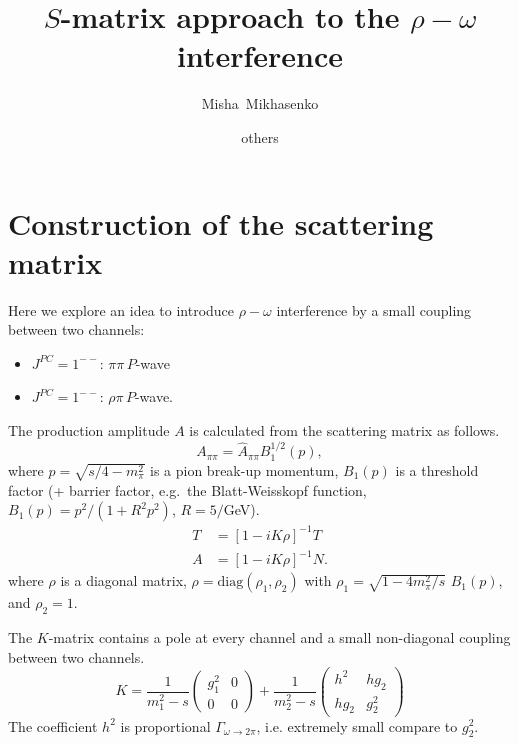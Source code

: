 \documentclass[aps,prd,superscriptaddress,onecolumn,nofootinbib,preprintnumbers,notitlepage]{revtex4-1}
\begin{document}
\title{$S$-matrix approach to the $\rho-\omega$ interference}
\author{Misha~Mikhasenko}
\author{others}

\nopagebreak
\maketitle

\section{Construction of the scattering matrix}

Here we explore an idea to introduce $\rho-\omega$ interference by a small coupling
between two channels:
\begin{itemize}
  \item $J^{PC}=1^{--}$: $\pi\pi\,P$-wave
  \item $J^{PC}=1^{--}$: $\rho\pi\,P$-wave.
\end{itemize}

The production amplitude $A$ is calculated from the scattering matrix as follows.
\begin{equation}
  A_{\pi\pi} = \hat{A}_{\pi\pi} B_1^{1/2}(p),
\end{equation}
where $p = \sqrt{s/4-m_\pi^2}$ is a pion break-up momentum,
$B_1(p)$ is a threshold factor (+ barrier factor, e.g.\ the Blatt-Weisskopf function, $B_1(p) = p^2/(1+R^2p^2)$, $R=5/$GeV). %
\begin{align} \label{eq:T.2x2}
  T &= \left[1-i K \rho \right]^{-1} T\\
  A &= \left[1-i K \rho \right]^{-1} N.
\end{align}
where $\rho$ is a diagonal matrix, $\rho = \text{diag}(\rho_1,\rho_2)$ with $\rho_1 = \sqrt{1-4m_\pi^2/s}\,\,B_1(p)$, and $\rho_2 = 1$.

The $K$-matrix contains a pole at every channel and a small non-diagonal coupling between two channels.
\begin{equation} \label{eq:K}
  K = \frac{1}{m_1^2-s}\begin{pmatrix}
    g_1^2 & 0\\
    0 & 0
  \end{pmatrix} +
  \frac{1}{m_2^2-s}\begin{pmatrix}
    h^2 & hg_2\\
    hg_2 & g_2^2
  \end{pmatrix}
\end{equation}
The coefficient $h^2$ is proportional $\Gamma_{\omega\to 2\pi}$, i.e. extremely small compare to $g_2^2$.
\end{document}
